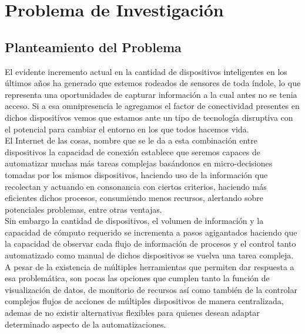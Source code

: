 

\chapter{Problema de Investigación}

\section{Planteamiento del Problema}
El evidente incremento actual en la cantidad de dispositivos inteligentes en los últimos años ha generado que estemos rodeados de sensores de toda índole, lo que representa una oportunidades de capturar información a la cual antes no se tenia acceso. Si a esa omnipresencia le agregamos el factor de conectividad presentes en dichos dispositivos vemos que estamos ante un tipo de tecnología disruptiva con el potencial para cambiar el entorno en los que todos hacemos vida. \\

El Internet de las cosas, nombre que se le da a esta combinación entre dispositivos la capacidad de conexión establece que seremos capaces de automatizar muchas más tareas complejas basándonos en micro-decisiones tomadas por los mismos dispositivos, haciendo uso de la información que recolectan y actuando en consonancia con ciertos criterios, haciendo más eficientes dichos procesos, consumiendo menos recursos, alertando sobre potenciales problemas, entre otras ventajas.\\

Sin embargo la cantidad de dispositivos, el volumen de información y la capacidad de cómputo requerido se incrementa a pasos agigantados haciendo que la capacidad de observar cada flujo de información de procesos y el control tanto automatizado como manual de dichos dispositivos se vuelva una tarea compleja. A pesar de la existencia de múltiples herramientas que permiten dar respuesta a esa problemática, son pocas las opciones que cumplen tanto la función de visualización de datos, de monitorio de recursos así como también de la controlar complejos flujos de acciones de múltiples dispositivos de manera centralizada, ademas de no existir alternativas flexibles para quienes desean adaptar determinado aspecto de la automatizaciones.


